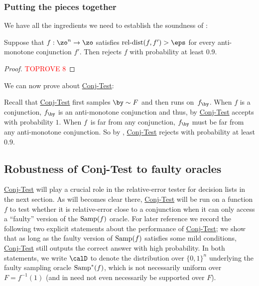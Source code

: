 \documentclass[11pt]{article}
\theoremstyle{definition}
\begin{document}
\subsubsection{Putting the pieces together}
We have all the ingredients we need to establish the soundness of : 
\begin{theorem}\label{thm: f isn't mono conj}
    Suppose that $f: \zo^n \to \zo$ satisfies $\reldist(f,f') >\eps$ for every anti-monotone conjunction $f'$. Then  rejects $f$ with probability at least 0.9.
\end{theorem}
\begin{proof}\textcolor{red}{TOPROVE 8}\end{proof}
We can now prove  about \hyperlink{Algorithm2}{\sc Conj-Test}:
\begin{proofof}{}
    Recall that \hyperlink{Algorithm2}{\sc Conj-Test} first samples $\by \sim F$ and then runs  on~$f_{\by}$. 
    When $f$ is a conjunction, $f_{\by}$ is an anti-monotone conjunction and thus, by  \hyperlink{Algorithm2}{\sc Conj-Test}   accepts with probability $1$.
    When  $f$~is far from any conjunction, $f_{\by}$ must be far from any anti-monotone conjunction. So by , \hyperlink{Algorithm2}{\sc Conj-Test} rejects with probability at least $0.9$. 
\end{proofof}
\subsection{Robustness of  {\sc Conj-Test} to faulty oracles} 

\hyperlink{Algorithm2}{\sc Conj-Test} will play a crucial role in the relative-error
  tester for decision lists in the next section.
As will becomes clear there, \hyperlink{Algorithm2}{\sc Conj-Test} will be run
  on a function $f$ to test whether it is relative-error close to a conjunction when it can only
  access a ``faulty''
  version of the $\mathrm{Samp}(f)$ oracle.
For later reference we record the following two explicit statements about
  the performance of \hyperlink{Algorithm2}{\sc Conj-Test};
  we show that as long as the faulty version of $\mathrm{Samp}(f)$ satisfies some mild conditions,
  \hyperlink{Algorithm2}{\sc Conj-Test} still outputs the correct answer with high probability.
In both statements, we write $\calD$ to denote the distribution over $\{0,1\}^n$
  underlying the faulty sampling oracle $\mathrm{Samp}^*(f)$, which is not necessarily
  uniform over $F=f^{-1}(1)$ (and {in } need not even necessarily be supported over $F$).
\end{document}
